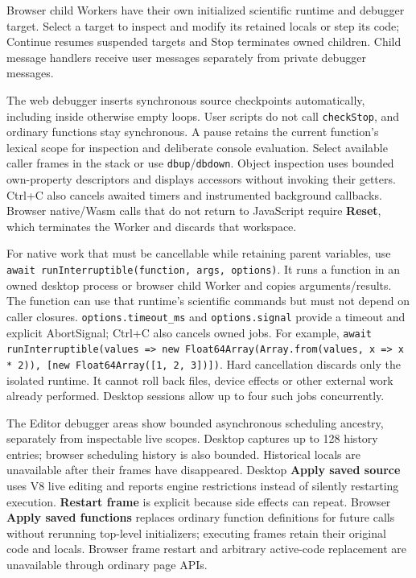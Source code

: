 \documentclass[12pt,a4paper]{article}
\begin{document}
Browser child Workers have their own initialized scientific runtime and debugger target. Select a target to inspect and modify its retained locals or step its code; Continue resumes suspended targets and Stop terminates owned children. Child message handlers receive user messages separately from private debugger messages.

The web debugger inserts synchronous source checkpoints automatically, including inside otherwise empty loops. User scripts do not call \texttt{checkStop}, and ordinary functions stay synchronous. A pause retains the current function's lexical scope for inspection and deliberate console evaluation. Select available caller frames in the stack or use \texttt{dbup}/\texttt{dbdown}. Object inspection uses bounded own-property descriptors and displays accessors without invoking their getters. Ctrl+C also cancels awaited timers and instrumented background callbacks. Browser native/Wasm calls that do not return to JavaScript require \textbf{Reset}, which terminates the Worker and discards that workspace.

For native work that must be cancellable while retaining parent variables, use \texttt{await runInterruptible(function, args, options)}. It runs a function in an owned desktop process or browser child Worker and copies arguments/results. The function can use that runtime's scientific commands but must not depend on caller closures. \texttt{options.timeout\_ms} and \texttt{options.signal} provide a timeout and explicit AbortSignal; Ctrl+C also cancels owned jobs. For example, \texttt{await runInterruptible(values => new Float64Array(Array.from(values, x => x * 2)), [new Float64Array([1, 2, 3])])}. Hard cancellation discards only the isolated runtime. It cannot roll back files, device effects or other external work already performed. Desktop sessions allow up to four such jobs concurrently.

The Editor debugger areas show bounded asynchronous scheduling ancestry, separately from inspectable live scopes. Desktop captures up to 128 history entries; browser scheduling history is also bounded. Historical locals are unavailable after their frames have disappeared. Desktop \textbf{Apply saved source} uses V8 live editing and reports engine restrictions instead of silently restarting execution. \textbf{Restart frame} is explicit because side effects can repeat. Browser \textbf{Apply saved functions} replaces ordinary function definitions for future calls without rerunning top-level initializers; executing frames retain their original code and locals. Browser frame restart and arbitrary active-code replacement are unavailable through ordinary page APIs.
\end{document}
